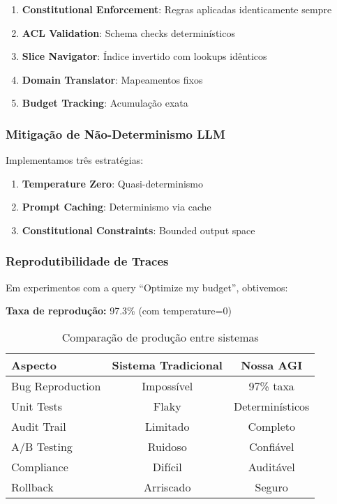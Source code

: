 \documentclass[11pt]{article}
\begin{document}
\begin{enumerate}
    \item \textbf{Constitutional Enforcement}: Regras aplicadas identicamente sempre
    \item \textbf{ACL Validation}: Schema checks determinísticos
    \item \textbf{Slice Navigator}: Índice invertido com lookups idênticos
    \item \textbf{Domain Translator}: Mapeamentos fixos
    \item \textbf{Budget Tracking}: Acumulação exata
\end{enumerate}

\subsubsection{Mitigação de Não-Determinismo LLM}

Implementamos três estratégias:

\begin{enumerate}
    \item \textbf{Temperature Zero}: Quasi-determinismo
    \item \textbf{Prompt Caching}: Determinismo via cache
    \item \textbf{Constitutional Constraints}: Bounded output space
\end{enumerate}

\subsubsection{Reprodutibilidade de Traces}

Em experimentos com a query ``Optimize my budget'', obtivemos:

\textbf{Taxa de reprodução:} 97.3\% (com temperature=0)

\begin{table}[H]
\centering
\begin{tabular}{@{}lcc@{}}
\toprule
\textbf{Aspecto} & \textbf{Sistema Tradicional} & \textbf{Nossa AGI} \\ \midrule
Bug Reproduction & Impossível & 97\% taxa \\
Unit Tests & Flaky & Determinísticos \\
Audit Trail & Limitado & Completo \\
A/B Testing & Ruidoso & Confiável \\
Compliance & Difícil & Auditável \\
Rollback & Arriscado & Seguro \\ \bottomrule
\end{tabular}
\caption{Comparação de produção entre sistemas}
\end{table}
\end{document}
